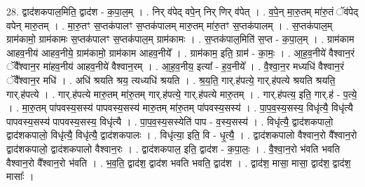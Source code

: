 \documentclass[17pt]{extarticle}
\begin{document}
28. द्वाद॑शकपाल॒मिति॒ द्वाद॑श - क॒पा॒ल॒म् । . निर् व॑पेद् वपे॒न् निर् णिर् व॑पेत् । . व॒पे॒न् मा॒रु॒तम् मा॑रु॒तं ॅव॑पेद् वपेन् मारु॒तम् । . मा॒रु॒तꣳ स॒प्तक॑पालꣳ स॒प्तक॑पालम् मारु॒तम् मा॑रु॒तꣳ स॒प्तक॑पालम् । . स॒प्तक॑पाल॒म् ग्राम॑कामो॒ ग्राम॑कामः स॒प्तक॑पालꣳ स॒प्तक॑पाल॒म् ग्राम॑कामः । . स॒प्तक॑पाल॒मिति॑ स॒प्त - क॒पा॒ल॒म् । . ग्राम॑काम आहव॒नीय॑ आहव॒नीये॒ ग्राम॑कामो॒ ग्राम॑काम आहव॒नीये᳚ । . ग्राम॑काम॒ इति॒ ग्राम॑ - का॒मः॒ । . आ॒ह॒व॒नीये॑ वैश्वान॒रं ॅवै᳚श्वान॒र मा॑हव॒नीय॑ आहव॒नीये॑ वैश्वान॒रम् । . आ॒ह॒व॒नीय॒ इत्या᳚ - ह॒व॒नीये᳚ । . वै॒श्वा॒न॒र मध्यधि॑ वैश्वान॒रं ॅवै᳚श्वान॒र मधि॑ । . अधि॑ श्रयति श्रय॒ त्यध्यधि॑ श्रयति । . श्र॒य॒ति॒ गार्.ह॑पत्ये॒ गार्.ह॑पत्ये श्रयति श्रयति॒ गार्.ह॑पत्ये । . गार्.ह॑पत्ये मारु॒तम् मा॑रु॒तम् गार्.ह॑पत्ये॒ गार्.ह॑पत्ये मारु॒तम् । . गार्.ह॑पत्य॒ इति॒ गार्.ह॑ - प॒त्ये॒ । . मा॒रु॒तम् पा॑पवस्य॒सस्य॑ पापवस्य॒सस्य॑ मारु॒तम् मा॑रु॒तम् पा॑पवस्य॒सस्य॑ । . पा॒प॒व॒स्य॒सस्य॒ विधृ॑त्यै॒ विधृ॑त्यै पापवस्य॒सस्य॑ पापवस्य॒सस्य॒ विधृ॑त्यै । . पा॒प॒व॒स्य॒सस्येति॑ पाप - व॒स्य॒सस्य॑ । . विधृ॑त्यै॒ द्वाद॑शकपालो॒ द्वाद॑शकपालो॒ विधृ॑त्यै॒ विधृ॑त्यै॒ द्वाद॑शकपालः । . विधृ॑त्या॒ इति॒ वि - धृ॒त्यै॒ । . द्वाद॑शकपालो वैश्वान॒रो वै᳚श्वान॒रो द्वाद॑शकपालो॒ द्वाद॑शकपालो वैश्वान॒रः । . द्वाद॑शकपाल॒ इति॒ द्वाद॑श - क॒पा॒लः॒ । . वै॒श्वा॒न॒रो भ॑वति भवति वैश्वान॒रो वै᳚श्वान॒रो भ॑वति । . भ॒व॒ति॒ द्वाद॑श॒ द्वाद॑श भवति भवति॒ द्वाद॑श । . द्वाद॑श॒ मासा॒ मासा॒ द्वाद॑श॒ द्वाद॑श॒ मासाः᳚ । \newline
\end{document}
